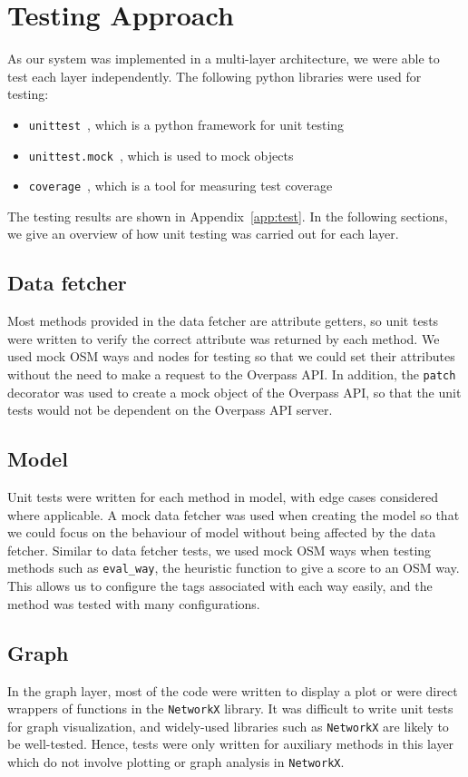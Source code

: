\documentclass[12pt,a4paper]{report}
\begin{document}
\section{Testing Approach}\label{sec:testing}
As our system was implemented in a multi-layer architecture, we were able to test each layer independently. The following python libraries were used for testing:
\begin{itemize}
    \item \texttt{unittest}~\cite{unittest}, which is a python framework for unit testing
    \item \texttt{unittest.mock}~\cite{unittest:mock}, which is used to mock objects
    \item \texttt{coverage}~\cite{coverage}, which is a tool for measuring test coverage
\end{itemize}

The testing results are shown in Appendix~\ref{app:test}. In the following sections, we give an overview of how unit testing was carried out for each layer.

\subsection{Data fetcher}
Most methods provided in the data fetcher are attribute getters, so unit tests were written to verify the correct attribute was returned by each method. We used mock OSM ways and nodes for testing so that we could set their attributes without the need to make a request to the Overpass API. In addition, the \texttt{patch} decorator was used to create a mock object of the Overpass API, so that the unit tests would not be dependent on the Overpass API server.

\subsection{Model}
Unit tests were written for each method in model, with edge cases considered where applicable. A mock data fetcher was used when creating the model so that we could focus on the behaviour of model without being affected by the data fetcher. Similar to data fetcher tests, we used mock OSM ways when testing methods such as \texttt{eval\_way}, the heuristic function to give a score to an OSM way. This allows us to configure the tags associated with each way easily, and the method was tested with many configurations.

\subsection{Graph}
In the graph layer, most of the code were written to display a plot or were direct wrappers of functions in the \texttt{NetworkX} library. It was difficult to write unit tests for graph visualization, and widely-used libraries such as \texttt{NetworkX} are likely to be well-tested. Hence, tests were only written for auxiliary methods in this layer which do not involve plotting or graph analysis in \texttt{NetworkX}.
\end{document}
